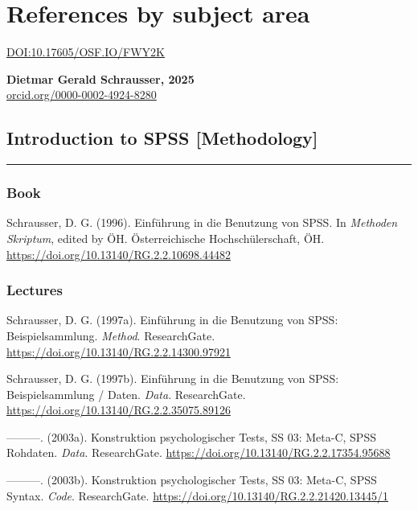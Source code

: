 \documentclass[
]{article}
\author{Dietmar Gerald SCHRAUSSER}
\date{13.04.2026}
\begin{document}
\hypertarget{references-by-subject-area}{%
\section{References by subject area}\label{references-by-subject-area}}

\href{https://doi.org/10.17605/OSF.IO/FWY2K}{DOI:10.17605/OSF.IO/FWY2K}

\textbf{Dietmar Gerald Schrausser, 2025}\\
\href{https://orcid.org/0000-0002-4924-8280}{orcid.org/0000-0002-4924-8280}

\hypertarget{introduction-to-spss-methodology}{%
\subsection{Introduction to SPSS
{[}Methodology{]}}\label{introduction-to-spss-methodology}}

\begin{center}\rule{0.5\linewidth}{0.5pt}\end{center}

\hypertarget{book}{%
\subsubsection{Book}\label{book}}

Schrausser, D. G. (1996). Einführung in die Benutzung von SPSS. In
\emph{Methoden Skriptum}, edited by ÖH. Österreichische
Hochschülerschaft, ÖH. \url{https://doi.org/10.13140/RG.2.2.10698.44482}

\hypertarget{lectures}{%
\subsubsection{Lectures}\label{lectures}}

Schrausser, D. G. (1997a). Einführung in die Benutzung von SPSS:
Beispielsammlung. \emph{Method}. ResearchGate.
\url{https://doi.org/10.13140/RG.2.2.14300.97921}

Schrausser, D. G. (1997b). Einführung in die Benutzung von SPSS:
Beispielsammlung / Daten. \emph{Data}. ResearchGate.
\url{https://doi.org/10.13140/RG.2.2.35075.89126}

---------. (2003a). Konstruktion psychologischer Tests, SS 03: Meta-C,
SPSS Rohdaten. \emph{Data}. ResearchGate.
\url{https://doi.org/10.13140/RG.2.2.17354.95688}

---------. (2003b). Konstruktion psychologischer Tests, SS 03: Meta-C,
SPSS Syntax. \emph{Code}. ResearchGate.
\url{https://doi.org/10.13140/RG.2.2.21420.13445/1}
\end{document}
